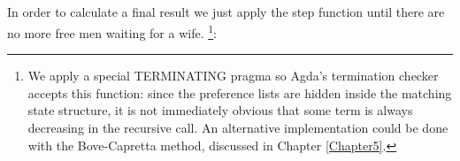 {\begin{code}
\AgdaSymbol{)}\AgdaSpace{}%
\AgdaSpace{}%
\AgdaSymbol{)}\AgdaSpace{}%
\AgdaSpace{}%
\AgdaSpace{}%
\AgdaSpace{}%
\AgdaSpace{}%
\AgdaSymbol{)}\<%
\\
\>[.]\<[889I]%
\>[5]\AgdaSymbol{|}\AgdaSpace{}%
\<%
\\
%
\>[5]\AgdaSymbol{=}\AgdaSpace{}%
%
\>[905I]\AgdaSpace{}%
\AgdaSpace{}%
\AgdaSymbol{((}\AgdaSpace{}%
\AgdaOperator{\AgdaInductiveConstructor{,}}\AgdaSpace{}%
\AgdaSymbol{)}\AgdaSpace{}%
\AgdaSpace{}%
\AgdaSymbol{)}\AgdaSpace{}%
\<%
\\
\>[.]\<[905I]%
\>[15]\AgdaSymbol{(}\AgdaSpace{}%
\AgdaSymbol{(}\AgdaSpace{}%
\AgdaOperator{\AgdaInductiveConstructor{,}}\AgdaSpace{}%
\AgdaSymbol{)}\AgdaSpace{}%
\AgdaSymbol{)}\<%
\\
%
\>[15]\AgdaSymbol{(}\AgdaSpace{}%
\AgdaSpace{}%
\AgdaSymbol{((}\AgdaSpace{}%
\AgdaOperator{\AgdaInductiveConstructor{,}}\AgdaSpace{}%
\AgdaSymbol{)}\AgdaSpace{}%
\AgdaSpace{}%
\AgdaSymbol{))}\AgdaSpace{}%
\<%
\end{code}

In order to calculate a final result we just apply the step function until there are no more free men waiting for a wife. \footnote{We apply a special TERMINATING pragma so Agda's termination checker accepts this function: since the preference lists are hidden inside the matching state structure, it is not immediately obvious that some term is always decreasing in the recursive call. An alternative implementation could be done with the Bove-Capretta method, discussed in Chapter \ref{Chapter5}.}:

}
